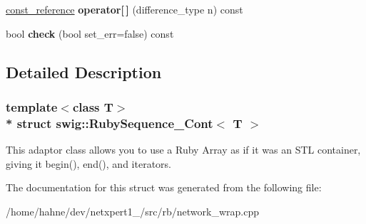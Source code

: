 \begin{DoxyCompactItemize}
\item 
\hyperlink{structswig_1_1RubySequence__Ref}{const\+\_\+reference} {\bfseries operator\mbox{[}$\,$\mbox{]}} (difference\+\_\+type n) const \hypertarget{structswig_1_1RubySequence__Cont_a0219565365ee784196165f48976e606d}{}\label{structswig_1_1RubySequence__Cont_a0219565365ee784196165f48976e606d}

\item 
bool {\bfseries check} (bool set\+\_\+err=false) const \hypertarget{structswig_1_1RubySequence__Cont_a5a252af7ffbe60b1713d4a832740585c}{}\label{structswig_1_1RubySequence__Cont_a5a252af7ffbe60b1713d4a832740585c}

\end{DoxyCompactItemize}


\subsection{Detailed Description}
\subsubsection*{template$<$class T$>$\\*
struct swig\+::\+Ruby\+Sequence\+\_\+\+Cont$<$ T $>$}

This adaptor class allows you to use a Ruby Array as if it was an S\+TL container, giving it begin(), end(), and iterators. 

The documentation for this struct was generated from the following file\+:\begin{DoxyCompactItemize}
\item 
/home/hahne/dev/netxpert1\+\_/src/rb/network\+\_\+wrap.\+cpp\end{DoxyCompactItemize}
